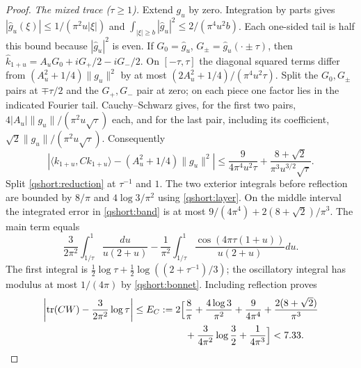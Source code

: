\begin{proof}
\emph{The mixed trace ($\tau\ge1$).}
Extend $g_u$ by zero. Integration by parts gives
$|\widehat g_u(\xi)|\le1/(\pi^2u|\xi|)$ and
$\int_{|\xi|\ge b}|\widehat g_u|^2\le2/(\pi^4u^2b)$.
Each one-sided tail is half this bound because $|\widehat g_u|^2$
is even. If $G_0=\widehat g_u$, $G_\pm=\widehat g_u(\cdot\pm\tau)$,
then $\widehat k_{1+u}=A_uG_0+iG_+/2-iG_-/2$.
On $[-\tau,\tau]$ the diagonal squared terms differ from
$(A_u^2+1/4)\|g_u\|^2$ by at most
$(2A_u^2+1/4)/(\pi^4u^2\tau)$.
Split the $G_0,G_\pm$ pairs at $\mp\tau/2$ and the $G_+,G_-$ pair
at zero; on each piece one factor lies in the indicated Fourier tail.
Cauchy--Schwarz gives, for the first two pairs,
$4|A_u|\|g_u\|/(\pi^2u\sqrt\tau)$ each, and for the last pair,
including its coefficient, $\sqrt2\|g_u\|/(\pi^2u\sqrt\tau)$.
Consequently
\begin{equation}\label{qshort:band}
\left|\langle k_{1+u},Ck_{1+u}\rangle
 -(A_u^2+1/4)\|g_u\|^2\right|
\le\frac9{4\pi^4u^2\tau}+
       \frac{8+\sqrt2}{\pi^3u^{3/2}\sqrt\tau}.
\end{equation}
Split \eqref{qshort:reduction} at $\tau^{-1}$ and $1$.
The two exterior integrals before reflection are bounded by
$8/\pi$ and $4\log3/\pi^2$ using \eqref{qshort:layer}.
On the middle interval the integrated error in \eqref{qshort:band}
is at most $9/(4\pi^4)+2(8+\sqrt2)/\pi^3$.
The main term equals
\[
\frac3{2\pi^2}\int_{1/\tau}^1\frac{du}{u(2+u)}
-\frac1{\pi^2}\int_{1/\tau}^1
 \frac{\cos(4\pi\tau(1+u))}{u(2+u)}du.
\]
The first integral is
$\frac12\log\tau+\frac12\log((2+\tau^{-1})/3)$;
the oscillatory integral has modulus at most $1/(4\pi)$ by
\eqref{qshort:bonnet}. Including reflection proves
\begin{equation}\label{qshort:cross-ledger}
\begin{split}
\left|\operatorname{tr}(CW)-\frac3{2\pi^2}\log\tau\right|
\le E_C:=2\Bigl[&\frac8\pi+\frac{4\log3}{\pi^2}
+\frac9{4\pi^4}+\frac{2(8+\sqrt2)}{\pi^3}
\\&+\frac3{4\pi^2}\log\frac32+\frac1{4\pi^3}\Bigr]<7.33.
\end{split}
\end{equation}


\end{proof}
